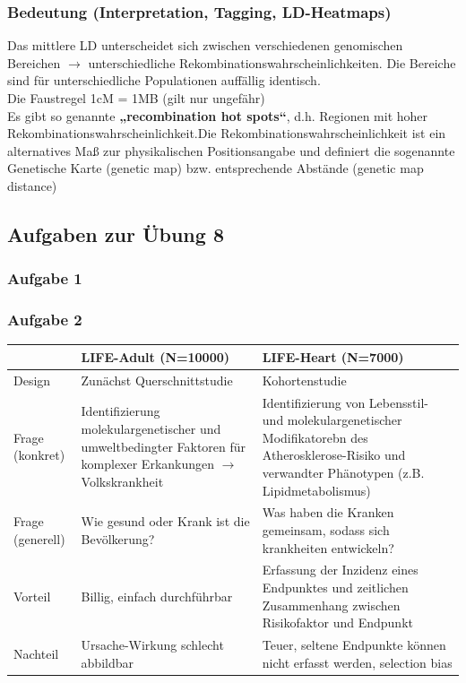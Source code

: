 \subsubsection{Bedeutung (Interpretation, Tagging, LD-Heatmaps)}
Das mittlere LD unterscheidet sich zwischen verschiedenen genomischen Bereichen $\rightarrow$ unterschiedliche Rekombinationswahrscheinlichkeiten. Die Bereiche sind für unterschiedliche Populationen auffällig identisch.\\
Die Faustregel 1cM = 1MB (gilt nur ungefähr)\\
Es gibt so genannte \textbf{„recombination hot spots“}, d.h. Regionen mit hoher Rekombinationswahrscheinlichkeit.Die Rekombinationswahrscheinlichkeit ist ein alternatives Maß zur physikalischen Positionsangabe und definiert die sogenannte Genetische Karte (genetic map) bzw. entsprechende Abstände (genetic map distance)

\subsection{Aufgaben zur Übung 8}
\subsubsection{Aufgabe 1}

\subsubsection{Aufgabe 2}
\begin{tabularx}{\textwidth}{|p{}|p{}|p{}|}
\hline
& LIFE-Adult (N=10000) & LIFE-Heart (N=7000) \\
\hline
Design & Zunächst Querschnittstudie & Kohortenstudie \\
\hline
Frage (konkret) & Identifizierung molekulargenetischer und umweltbedingter Faktoren für komplexer Erkankungen $\rightarrow$ Volkskrankheit & Identifizierung von Lebensstil- und molekulargenetischer Modifikatorebn des Atherosklerose-Risiko und verwandter Phänotypen (z.B. Lipidmetabolismus) \\
\hline
Frage (generell) & Wie gesund oder Krank ist die Bevölkerung? & Was haben die Kranken gemeinsam, sodass sich krankheiten entwickeln? \\
\hline
Vorteil & Billig, einfach durchführbar & Erfassung der Inzidenz eines Endpunktes und zeitlichen Zusammenhang zwischen Risikofaktor und Endpunkt \\
\hline
Nachteil & Ursache-Wirkung schlecht abbildbar & Teuer, seltene Endpunkte können nicht erfasst werden, selection bias\\
\hline
\end{tabularx}


